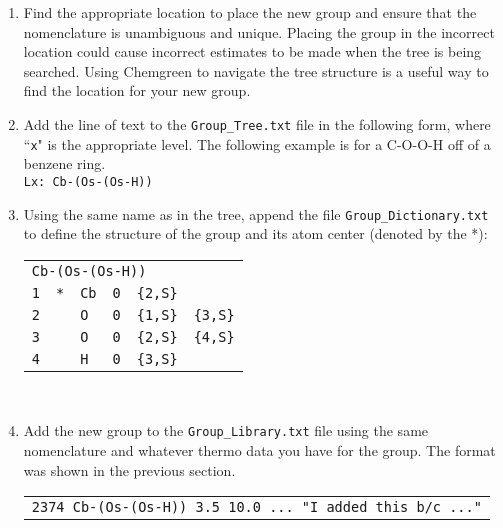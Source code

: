 \documentclass[12pt,letterpaper]{article}
\begin{document}
\begin{enumerate}

\item Find the appropriate location to place the new group and ensure that
the nomenclature is unambiguous and unique. Placing the group in the
incorrect location could cause incorrect estimates to be made when the
tree is being searched. Using Chemgreen to navigate the tree structure
is a useful way to find the location for your new group.\\

\item Add the line of text to the \texttt{Group\_Tree.txt} file in the following form,
where ``\texttt{x}" is the appropriate level. The following example is for a C-O-O-H off of a
benzene ring.\\

\texttt{Lx: Cb-(Os-(Os-H))}\\

\item Using the same name as in the tree, append the file \texttt{Group\_Dictionary.txt} to define the structure of the group and its atom center (denoted by the *):

\begin{tabular}{llllll}
\multicolumn{6}{l}{\texttt{Cb-(Os-(Os-H))}} \\
\texttt{1} & \texttt{*} & \texttt{Cb}  & \texttt{0} & \texttt{\{2,S\}} &  \\
\texttt{2} &            & \texttt{O}  & \texttt{0} & \texttt{\{1,S\}} & \texttt{\{3,S\}} \\
\texttt{3} &            & \texttt{O} & \texttt{0} & \texttt{\{2,S\}} & \texttt{\{4,S\}} \\
\texttt{4} &            & \texttt{H}   & \texttt{0} & \texttt{\{3,S\}} & \\
\end{tabular}\\

\item Add the new group to the \texttt{Group\_Library.txt} file using the same nomenclature
and whatever thermo data you have for the group. The format was shown in the previous section.\\

\begin{tabular}{l}
{\small{\texttt{2374 Cb-(Os-(Os-H)) 3.5 10.0 ... "I added this b/c ..."} }}\\
\end{tabular}\\
\end{enumerate}
\end{document}
